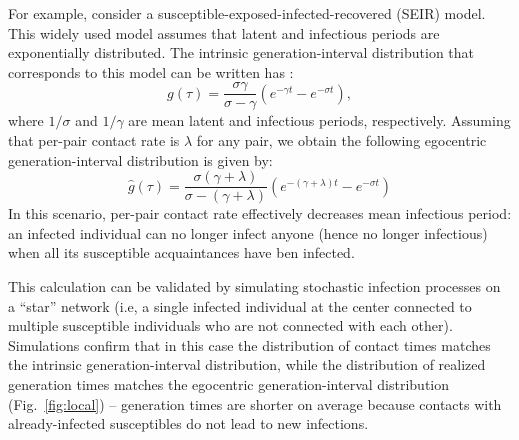 \documentclass[12pt]{article}
\newcommand{\fref}[1]{Fig.~\ref{fig:#1}}
\begin{document}
For example, consider a susceptible-exposed-infected-recovered (SEIR) model.
This widely used model assumes that latent and infectious periods are exponentially distributed.
The intrinsic generation-interval distribution that corresponds to this model can be written has \citep{svensson2015influence}:
\begin{equation}
g(\tau) = \frac{\sigma \gamma}{\sigma - \gamma} \left(e^{-\gamma t} - e^{-\sigma t}\right),
\end{equation}
where $1/\sigma$ and $1/\gamma$ are mean latent and infectious periods, respectively.
Assuming that per-pair contact rate is $\lambda$ for any pair, we obtain the following egocentric generation-interval distribution is given by:
\begin{equation}
\hat{g}(\tau) = \frac{\sigma (\gamma + \lambda)}{\sigma - (\gamma + \lambda)} \left(e^{-(\gamma + \lambda)t} - e^{-\sigma t}\right)
\end{equation}
In this scenario, per-pair contact rate effectively decreases mean infectious period: an infected individual can no longer infect anyone (hence no longer infectious) when all its susceptible acquaintances have ben infected.

This calculation can be validated by simulating stochastic infection processes on a ``star'' network (i.e, a single infected individual at the center connected to multiple susceptible individuals who are not connected with each other).
Simulations confirm that in this case the distribution of contact times matches the intrinsic generation-interval distribution, while the distribution of realized generation times matches the egocentric generation-interval distribution (\fref{local}) -- generation times are shorter on average because contacts with already-infected susceptibles do not lead to new infections.
\end{document}
